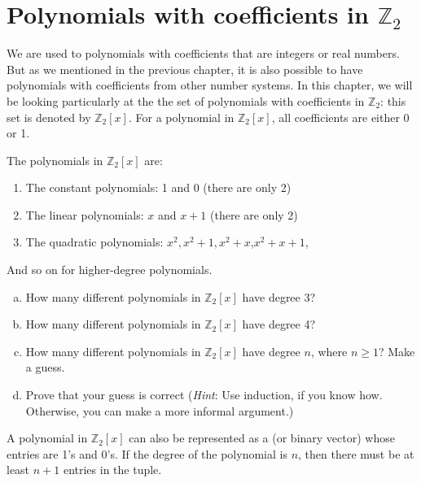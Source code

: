 

\section{Polynomials with coefficients in $\mathbb{Z}_2$}
\label{sec:PolynomialCodes:CoefficientsInZ2}

We are used to polynomials with coefficients that are integers or real numbers. But as we mentioned in the previous chapter, it is also possible to have polynomials with coefficients from other number systems. In this chapter, we will be looking particularly 
at the the set of polynomials with coefficients in  $\mathbb{Z}_2$: this set is denoted by $\mathbb{Z}_2[x]$.
For a polynomial in $\mathbb{Z}_2[x]$, all coefficients are either 0 or 1.

\begin{example}{}
The polynomials in $\mathbb{Z}_2[x]$ are:
\begin{enumerate}[.]
\item
The constant polynomials: 1 and 0 (there are only 2)
\item
The linear polynomials: $x$ and $x+1$ (there are only 2)
\item
The quadratic polynomials: $x^2, x^2+1, x^2 + x$,$x^2 + x+1$,
\end {enumerate}
And so on for higher-degree polynomials.
\end {example}

\begin{exercise}{}
\begin{enumerate}[(a)]
\item
How many different polynomials in $\mathbb{Z}_2[x]$ have degree 3?
\item
How many different polynomials in $\mathbb{Z}_2[x]$ have degree 4?
\item
How  many different polynomials in $\mathbb{Z}_2[x]$ have degree $n$, where $n \ge 1$?  Make a guess.
\item
Prove that your guess is correct (\emph{Hint}: Use induction, if you know how.  Otherwise, you can make a more informal argument.)
\end{enumerate}
\end{exercise}

A polynomial in $\mathbb{Z}_2[x]$ can also be represented as a  (or binary vector) whose entries are 1's and 0's. If the degree of the polynomial is $n$, then there must be at least $n+1$ entries in the tuple.

